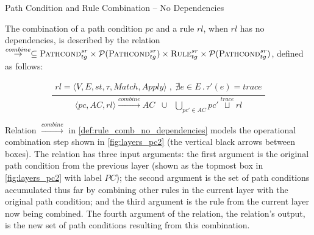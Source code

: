 \begin{definition}{Path Condition and Rule Combination -- No Dependencies\\}
\label{def:rule_comb_no_dependencies}

The combination of a path condition $pc$ and a rule $rl$, when $rl$ has no dependencies, is described by the relation $\stackrel{combine}{\rightarrow}\subseteq \textsc{Pathcond}^{sr}_{tg} \times \mathcal{P}(\textsc{Pathcond}^{sr}_{tg}) \times \textsc{Rule}^{sr}_{tg} \times \mathcal{P}(\textsc{Pathcond}^{sr}_{tg})$, defined as follows:	


$$\frac{\begin{array}{ll}rl=\langle V,E,st,\tau, Match,Apply\big\rangle\;,\;\nexists e\in E\,.\,\tau'(e)=trace
\end{array}}
{\langle pc,AC,rl\rangle \xrightarrow{combine} AC\;\;\cup\;\; \bigcup_{pc'\in AC} pc'\stackrel{trace}{\sqcup} rl}$$

\end{definition}



Relation $\stackrel{combine}{\rightarrow}$ in \cref{def:rule_comb_no_dependencies} models the operational combination step shown in \cref{fig:layers_pc2} (the vertical black arrows between boxes). The relation has three input arguments: the first argument is the original path condition from the previous layer (shown as the topmost box in \cref{fig:layers_pc2} with label $PC$); the second argument is the set of path conditions accumulated thus far by combining other rules in the current layer with the original path condition; and the third argument is the rule from the current layer now being combined. The fourth argument of the relation, the relation's output, is the new set of path conditions resulting from this combination.

